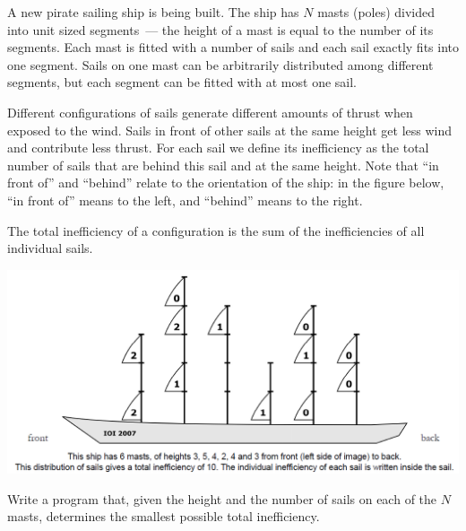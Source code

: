 A new pirate sailing ship is being built. The ship has $N$ masts (poles) divided into unit sized segments~--- the height of a mast is equal to the number of its segments. Each mast is fitted with a number of sails and each sail exactly fits into one segment. Sails on one mast can be arbitrarily distributed among different segments, but each
segment can be fitted with at most one sail.

Different configurations of sails generate different amounts of thrust when exposed to the wind. Sails in front of other sails at the same height get less wind and contribute less thrust. For each sail we define its inefficiency as the total number of sails that are behind this sail and at the same height. Note that ``in front of'' and ``behind''
relate to the orientation of the ship: in the figure below, ``in front of'' means to the left, and ``behind'' means to the right.

The total inefficiency of a configuration is the sum of the inefficiencies of all individual sails.

\includegraphics[scale=0.6]{sails.png}


Write a program that, given the height and the number of sails on each of the $N$ masts, determines the smallest possible total inefficiency.